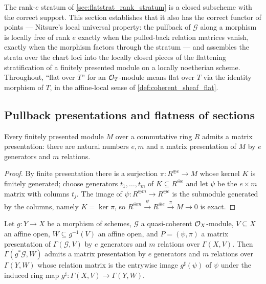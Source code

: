 The rank-\(e\) stratum of \cref{sec:flatstrat_rank_stratum} is a closed
subscheme with the correct support.  This section establishes that it also
has the correct functor of points --- Nitsure's local universal property:
the pullback of \(\mathcal G\) along a morphism is locally free of rank
\(e\) exactly when the pulled-back relation matrices vanish, exactly when
the morphism factors through the stratum --- and assembles the strata over
the chart loci into the locally closed pieces of the flattening
stratification of a finitely presented module on a locally noetherian
scheme.  Throughout, ``flat over \(T\)'' for an \(\mathcal{O}_T\)-module means flat
over \(T\) via the identity morphism of \(T\), in the affine-local sense of
\cref{def:coherent_sheaf_flat}.

\subsection{Pullback presentations and flatness of sections}

\begin{lemma}
  \label{lem:exists_matrix_presentation}
  \leanok
  Every finitely presented module \(M\) over a commutative ring \(R\) admits
  a matrix presentation: there are natural numbers \(e, m\) and a matrix
  presentation of \(M\) by \(e\) generators and \(m\) relations.
\end{lemma}

\begin{proof}
  \leanok
  By finite presentation there is a surjection \(\pi : R^{\oplus e} \to M\)
  whose kernel \(K\) is finitely generated; choose generators
  \(t_1, \dots, t_m\) of \(K \subseteq R^{\oplus e}\) and let \(\psi\) be
  the \(e \times m\) matrix with columns \(t_j\).  The image of
  \(\psi : R^{\oplus m} \to R^{\oplus e}\) is the submodule generated by
  the columns, namely \(K = \ker \pi\), so
  \(R^{\oplus m} \xrightarrow{\psi} R^{\oplus e} \xrightarrow{\pi} M \to 0\)
  is exact.
\end{proof}

\begin{lemma}
  \label{lem:presentation_pullback_sections}
  \leanok
  Let \(g : Y \to X\) be a morphism of schemes, \(\mathcal G\) a
  quasi-coherent \(\mathcal{O}_X\)-module, \(V \subseteq X\) an affine open,
  \(W \subseteq g^{-1}(V)\) an affine open, and \(P = (\psi, \pi)\) a matrix
  presentation of \(\Gamma(\mathcal G, V)\) by \(e\) generators and \(m\)
  relations over \(\Gamma(X, V)\).  Then \(\Gamma(g^*\mathcal G, W)\) admits
  a matrix presentation by \(e\) generators and \(m\) relations over
  \(\Gamma(Y, W)\) whose relation matrix is the entrywise image
  \(g^\sharp(\psi)\) of \(\psi\) under the induced ring map
  \(g^\sharp : \Gamma(X, V) \to \Gamma(Y, W)\).
\end{lemma}

